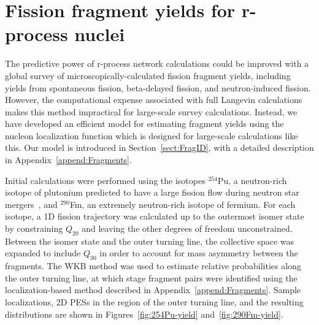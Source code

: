 \section{Fission fragment yields for r-process nuclei}
The predictive power of r-process network calculations could be improved with a global survey of microscopically-calculated fission fragment yields, including yields from spontaneous fission, beta-delayed fission, and neutron-induced fission. However, the computational expense associated with full Langevin calculations makes this method impractical for large-scale survey calculations. Instead, we have developed an efficient model for estimating fragment yields using the nucleon localization function which is designed for large-scale calculations like this. Our model is introduced in Section~\ref{sect:FragID}, with a detailed description in Appendix~\ref{append:Fragments}.


Initial calculations were performed using the isotopes $^{254}$Pu, a neutron-rich isotope of plutonium predicted to have a large fission flow during neutron star mergers~\cite{Vassh2019}, and $^{290}$Fm, an extremely neutron-rich isotope of fermium. For each isotope, a 1D fission trajectory was calculated up to the outermost isomer state by constraining $Q_{20}$ and leaving the other degrees of freedom unconstrained. Between the isomer state and the outer turning line, the collective space was expanded to include $Q_{30}$ in order to account for mass asymmetry between the fragments. The WKB method was used to estimate relative probabilities along the outer turning line, at which stage fragment pairs were identified using the localization-based method described in Appendix~\ref{append:Fragments}. Sample localizations, 2D PESs in the region of the outer turning line, and the resulting distributions are shown in Figures~\ref{fig:254Pu-yield} and~\ref{fig:290Fm-yield}.

